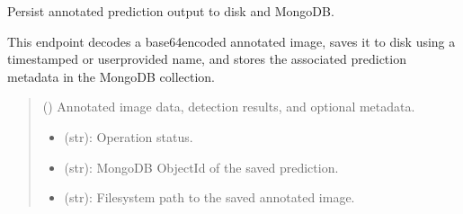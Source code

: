 \documentclass[letterpaper,10pt,english]{sphinxmanual}
\begin{document}

\begin{fulllineitems}
\label{\detokenize{modules/src.pig_sorting_api.main:src.pig_sorting_api.main.save_prediction}}
\pysigstartsignatures
\pysiglinewithargsret
{}
{}
{}
\pysigstopsignatures
\sphinxAtStartPar
Persist annotated prediction output to disk and MongoDB.

\sphinxAtStartPar
This endpoint decodes a base64\sphinxhyphen{}encoded annotated image, saves it to
disk using a timestamped or user\sphinxhyphen{}provided name, and stores the
associated prediction metadata in the MongoDB 
collection.
\begin{quote}\begin{description}
\sphinxAtStartPar
{} ({\hyperref[\detokenize{modules/src.pig_sorting_api.main:src.pig_sorting_api.main.SavePredictionRequest}]{}}) \textendash{} Annotated image data, detection
results, and optional metadata.

\sphinxAtStartPar
\begin{description}
\begin{itemize}
\item {} 
\sphinxAtStartPar
{} (str): Operation status.

\item {} 
\sphinxAtStartPar
{} (str): MongoDB ObjectId of the saved prediction.

\item {} 
\sphinxAtStartPar
{} (str): Filesystem path to the saved annotated image.

\end{itemize}

\end{description}



\end{description}
\end{quote}
\end{fulllineitems}
\end{document}
